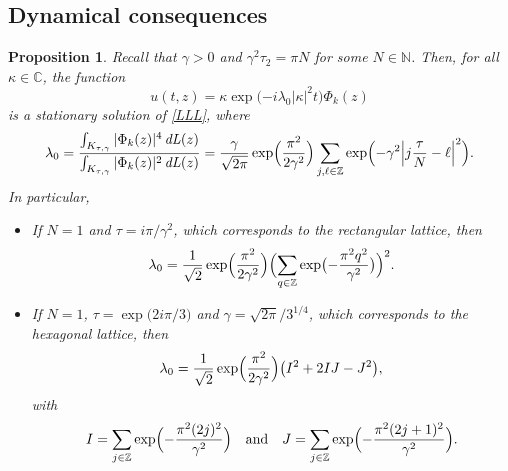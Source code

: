 \documentclass[10pt]{amsart}
\DeclareMathOperator{\dL}{\mathit{dL}}
\newtheorem{prop}[theorem]{Proposition}
\theoremstyle{definition}
\let\EE\exp
\newcommand\C{\mathbb C}
\newcommand\Z{\mathbb Z}
\let\Subsection\subsection\let\Subsubsection\subsubsection
\begin{document}
\Subsection{Dynamical consequences}

\begin{prop}\label{prop34}
Recall that $\gamma > 0$ and $\gamma^2 \tau_2 = \pi N$ for some $N \in \mathbb{N}$. Then, for all $\kappa \in \C$, the function
\[
u(t,z) = \kappa \EE\bigl({-i\lambda_0 |\kappa|^2t}\bigr)\Phi_k(z)
\]
is a stationary solution of \eqref{LLL}, where
\begin{equation}\label{def-lambda}
\lambda_0=\frac{\int_{K_{\tau, \gamma}} |\Phi_{k}(z)|^4\dL(z)}{\int_{K_{\tau, \gamma}} |\Phi_{k}(z)|^2\dL(z)}= \frac{\gamma}{\sqrt{2\pi}} \EE\Bigl(\frac{\pi^2}{2\gamma^2}\Bigr)\sum_{j, \ell\in \Z}\EE\Bigl({-\gamma^2 \Bigl|j\frac{\tau}N-\ell \Bigr|^{2}}\Bigr).
\end{equation}
In particular,
\begin{itemize}
\item If $N=1$ and $\tau={i \pi }/{\gamma^2}$, which corresponds to the rectangular lattice, then
\begin{equation}\label{lambda-carre}
\lambda_0= \frac{1}{\sqrt{2}} \EE\Bigl(\frac{\pi^2}{2\gamma^2}\Bigr)\Bigl(\sum_{q\in\Z}\EE\bigl({-\frac{\pi^2q^2}{\gamma^2}}\bigr)\Bigr)^2.
\end{equation}
\item If $N=1$, $\tau=\EE\bigl({{2 i\pi}/3}\bigr)$ and $\gamma={\sqrt{2\pi}}/ {3^{1/4}}$, which corresponds to the hexagonal lattice, then
\begin{equation}\label{lambda-hexa}
\lambda_0=\frac{1}{\sqrt{2}} \EE\Bigl(\frac{\pi^2}{2\gamma^2}\Bigr)\bigl(I^2+2IJ-J^2\bigr),
\end{equation}
with
\[
I = \sum_{j \in \Z}\EE\Bigl(- \frac{\pi^2(2j)^2}{\gamma^2} \Bigr) \quad\text{and} \quad J=\sum_{j \in \Z}\EE\Bigl(- \frac{\pi^2(2j+1)^2}{\gamma^2} \Bigr).
\]
\end{itemize}
\end{prop}
\end{document}
